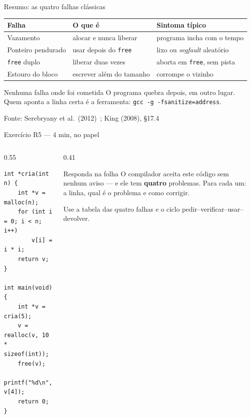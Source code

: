 \documentclass[aspectratio=169]{beamer}
\newcommand{\fonte}[1]{\vfill\hfill{\scriptsize\textcolor{UFSGray}{Fonte: #1}}}
\begin{document}
\begin{frame}{Resumo: as quatro falhas clássicas}
  \begin{center}
  \small
  \begin{tabular}{lll}
    \toprule
    Falha & O que é & Sintoma típico \\
    \midrule
    Vazamento          & alocar e nunca liberar        & programa incha com o tempo \\
    Ponteiro pendurado & usar depois do \texttt{free}  & lixo ou \emph{segfault} aleatório \\
    \texttt{free} duplo & liberar duas vezes           & aborta em \texttt{free}, sem pista \\
    Estouro do bloco   & escrever além do tamanho      & corrompe o vizinho \\
    \bottomrule
  \end{tabular}
  \end{center}
  \begin{block}{Nenhuma falha onde foi cometida}
    \small O programa quebra depois, em outro lugar. Quem aponta a linha certa
    é a ferramenta: \texttt{gcc -g -fsanitize=address}.
  \end{block}
  \fonte{Serebryany et al.\ (2012)~\cite{serebryany2012asan}; King (2008), §17.4~\cite{king2008c}}
\end{frame}

\begin{frame}[fragile]{Exercício R5 --- 4 min, no papel}
  \begin{columns}[T]
    \begin{column}{0.55\textwidth}
\begin{lstlisting}[style=numC]
int *cria(int n) {
    int *v = malloc(n);
    for (int i = 0; i < n; i++)
        v[i] = i * i;
    return v;
}

int main(void) {
    int *v = cria(5);
    v = realloc(v, 10 * sizeof(int));
    free(v);
    printf("%d\n", v[4]);
    return 0;
}
\end{lstlisting}
    \end{column}
    \begin{column}{0.41\textwidth}
      \begin{block}{Responda na folha}
        \small O compilador aceita este código sem nenhum aviso --- e ele tem
        \textbf{quatro} problemas. Para cada um: a linha, qual é o problema e
        como corrigir.
      \end{block}
      \scriptsize\textcolor{UFSGray}{Use a tabela das quatro falhas e o
      ciclo pedir--verificar--usar--devolver.}
    \end{column}
  \end{columns}
\end{frame}
\end{document}
